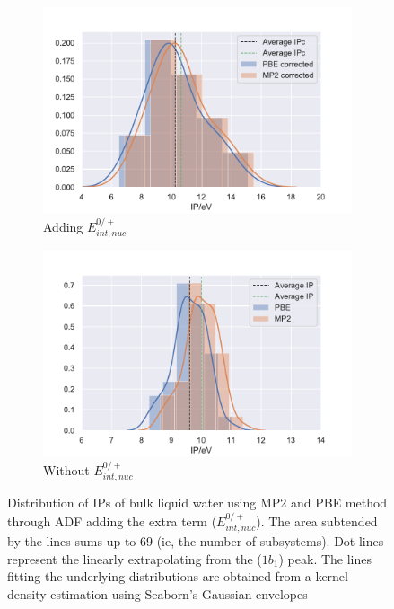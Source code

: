 \documentclass[12pt,a4paper]{article}
\begin{document}
\begin{figure}[!ht]
        \captionsetup[subfigure]{labelformat=empty}
        \centering
        \begin{subfigure}{0.4\linewidth}
		\includegraphics[width=\linewidth]{Corrected}
		\caption{Adding $E_{int,nuc}^{0/+}$ }
        \end{subfigure}
        \begin{subfigure}{0.4\linewidth}
                \includegraphics[width=\linewidth]{Without-Correction}
                \caption{Without $E_{int,nuc}^{0/+}$ }
        \end{subfigure}
        \caption{Distribution of IPs of bulk liquid water using MP2 and PBE method through ADF \cite{te2001chemistry} adding the extra term ($E_{int,nuc}^{0/+}$). The area subtended by the lines sums up to 69 (ie, the number of subsystems). Dot lines represent the linearly extrapolating from the ($1b_{1}$) peak. The lines fitting the underlying distributions are obtained from a kernel density estimation using Seaborn's Gaussian envelopes\cite{waskom2017c}}
\end{figure}
\end{document}
